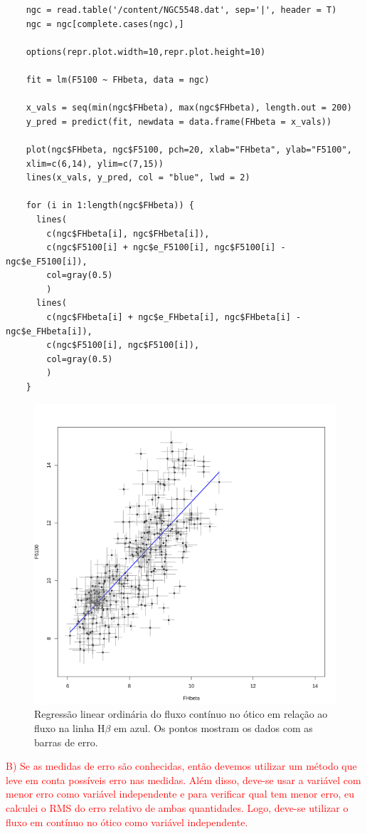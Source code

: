 \begin{lstlisting}
    ngc = read.table('/content/NGC5548.dat', sep='|', header = T)
    ngc = ngc[complete.cases(ngc),]
    
    options(repr.plot.width=10,repr.plot.height=10)
    
    fit = lm(F5100 ~ FHbeta, data = ngc)
    
    x_vals = seq(min(ngc$FHbeta), max(ngc$FHbeta), length.out = 200)
    y_pred = predict(fit, newdata = data.frame(FHbeta = x_vals))
    
    plot(ngc$FHbeta, ngc$F5100, pch=20, xlab="FHbeta", ylab="F5100",
    xlim=c(6,14), ylim=c(7,15))
    lines(x_vals, y_pred, col = "blue", lwd = 2)
    
    for (i in 1:length(ngc$FHbeta)) {
      lines(
        c(ngc$FHbeta[i], ngc$FHbeta[i]),
        c(ngc$F5100[i] + ngc$e_F5100[i], ngc$F5100[i] - ngc$e_F5100[i]),
        col=gray(0.5)
        )
      lines(
        c(ngc$FHbeta[i] + ngc$e_FHbeta[i], ngc$FHbeta[i] - ngc$e_FHbeta[i]),
        c(ngc$F5100[i], ngc$F5100[i]),
        col=gray(0.5)
        )
    }
\end{lstlisting}


\begin{figure}[h]
    \centering
    \includegraphics[width=0.6\linewidth]{Figuras/fit_a.png}
    \caption{Regressão linear ordinária do fluxo contínuo no ótico em relação ao fluxo na linha H$\beta$ em azul. Os pontos mostram os dados com as barras de erro.}
    \label{fit_a}
\end{figure}


\textcolor{red}{B) Se as medidas de erro são conhecidas, então devemos utilizar um método que leve em conta possíveis erro nas medidas. Além disso, deve-se usar a variável com menor erro como variável independente e para verificar qual tem menor erro, eu calculei o RMS do erro relativo de ambas quantidades. Logo, deve-se utilizar o fluxo em contínuo no ótico como variável independente.}

